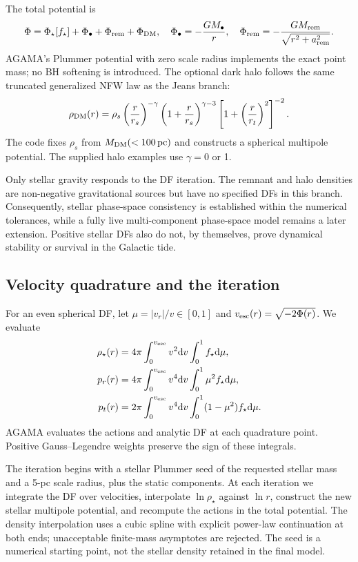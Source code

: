 \documentclass[11pt,a4paper]{article}
\newcommand{\pc}{\,\mathrm{pc}}
\newcommand{\dd}{\mathrm{d}}
\begin{document}
The total potential is
\begin{equation}
 \Phi=\Phi_\star[f_\star]+\Phi_\bullet+\Phi_{\rm rem}+\Phi_{\rm DM},
 \quad \Phi_\bullet=-\frac{GM_\bullet}{r},\quad
 \Phi_{\rm rem}=-\frac{GM_{\rm rem}}{\sqrt{r^2+a_{\rm rem}^2}}.
\end{equation}
AGAMA's Plummer potential with zero scale radius implements the exact point
mass; no BH softening is introduced. The optional dark halo follows the
same truncated generalized NFW law as the Jeans branch:
\begin{equation}
 \rho_{\rm DM}(r)=\rho_s
 \left(\frac r{r_s}\right)^{-\gamma}
 \left(1+\frac r{r_s}\right)^{\gamma-3}
 \left[1+\left(\frac r{r_t}\right)^2\right]^{-2}.
 \label{eq:halo}
\end{equation}
The code fixes $\rho_s$ from $M_{\rm DM}(<100\pc)$ and constructs a spherical
multipole potential. The supplied halo examples use $\gamma=0$ or 1.

Only stellar gravity responds to the DF iteration. The remnant and halo
densities are non-negative gravitational sources but have no specified DFs
in this branch. Consequently, stellar phase-space consistency is established
within the numerical tolerances, while a fully live multi-component
phase-space model remains a later extension. Positive stellar DFs also do
not, by themselves, prove dynamical stability or survival in the Galactic tide.

\subsection{Velocity quadrature and the iteration}

For an even spherical DF, let $\mu=|v_r|/v\in[0,1]$ and
$v_{\rm esc}(r)=\sqrt{-2\Phi(r)}$. We evaluate
\begin{align}
 \rho_\star(r)&=4\pi\int_0^{v_{\rm esc}}v^2\dd v\int_0^1 f_\star\dd\mu,\\
 p_r(r)&=4\pi\int_0^{v_{\rm esc}}v^4\dd v\int_0^1\mu^2 f_\star\dd\mu,\\
 p_t(r)&=2\pi\int_0^{v_{\rm esc}}v^4\dd v\int_0^1(1-\mu^2)f_\star\dd\mu.
 \label{eq:quadrature}
\end{align}
AGAMA evaluates the actions and analytic DF at each quadrature point.
Positive Gauss--Legendre weights preserve the sign of these integrals.

The iteration begins with a stellar Plummer seed of the requested stellar
mass and a 5-pc scale radius, plus the static components. At each iteration
we integrate the DF over velocities, interpolate $\ln\rho_\star$ against
$\ln r$, construct the new stellar multipole potential, and recompute the
actions in the total potential. The density interpolation uses a cubic spline
with explicit power-law continuation at both ends; unacceptable finite-mass
asymptotes are rejected. The seed is a numerical starting point, not the
stellar density retained in the final model.
\end{document}
